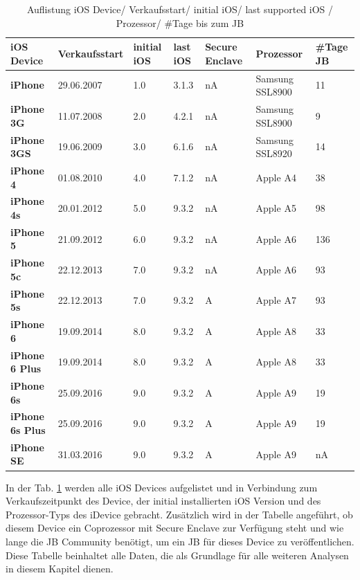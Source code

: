 \begin{table}[htp!]
    \begin{center}
        \begin{tabular}{|p{30mm}|p{27mm}|p{12mm}|p{10mm}|p{18mm}|p{2cm}|p{15mm}|} \hline
            \textbf{iOS Device} & \textbf{Verkaufsstart} & \textbf{initial iOS} & \textbf{last iOS} & \textbf{Secure Enclave} & \textbf{Prozessor}  & \textbf{\#Tage JB} \\ \hline
            \textbf{iPhone} & 29.06.2007  & 1.0 & 3.1.3 & nA & Samsung SSL8900 & 11\\ \hline
            \textbf{iPhone 3G} & 11.07.2008 & 2.0 & 4.2.1 & nA & Samsung SSL8900 & 9\\ \hline
            \textbf{iPhone 3GS} & 19.06.2009 & 3.0 & 6.1.6 & nA & Samsung SSL8920 & 14\\ \hline
            \textbf{iPhone 4} & 01.08.2010 & 4.0 & 7.1.2 & nA & Apple A4 & 38 \\ \hline
            \textbf{iPhone 4s} & 20.01.2012 & 5.0 & 9.3.2 & nA & Apple A5 & 98 \\ \hline 
            \textbf{iPhone 5} & 21.09.2012 & 6.0 &  9.3.2 & nA & Apple A6 & 136 \\ \hline
            \textbf{iPhone 5c} & 22.12.2013 & 7.0 & 9.3.2 & nA & Apple A6 & 93 \\ \hline
            \textbf{iPhone 5s} & 22.12.2013 & 7.0 & 9.3.2 & A & Apple A7 & 93 \\ \hline
            \textbf{iPhone 6} & 19.09.2014 & 8.0 & 9.3.2 & A & Apple A8 & 33\\ \hline
            \textbf{iPhone 6 Plus} & 19.09.2014 & 8.0 & 9.3.2 &  A & Apple A8 & 33\\ \hline
            \textbf{iPhone 6s} & 25.09.2016 & 9.0 &  9.3.2 & A & Apple A9 & 19\\ \hline
            \textbf{iPhone 6s Plus} & 25.09.2016 & 9.0 & 9.3.2 &  A & Apple A9 & 19\\ \hline
            \textbf{iPhone SE} & 31.03.2016 & 9.0 &  9.3.2 & A & Apple A9 & nA\\ \hline  
        \end{tabular} 
        \caption{Auflistung iOS Device/ Verkaufsstart/ initial iOS/ last supported iOS / Prozessor/ \#Tage bis zum JB \protect\footnotemark}
        \label{tab:iOSHW}
    \end{center}
\end{table}

In der Tab. \ref{tab:iOSHW} werden alle iOS Devices aufgelistet und in Verbindung zum Verkaufszeitpunkt des Device, der initial installierten iOS Version und des Prozessor-Typs des iDevice gebracht. Zusätzlich wird in der Tabelle angeführt, ob diesem Device ein Coprozessor mit Secure Enclave zur Verfügung steht und wie lange die JB Community benötigt, um ein JB für dieses Device zu veröffentlichen. Diese Tabelle beinhaltet alle Daten, die als Grundlage für alle weiteren Analysen in diesem Kapitel dienen.\par


